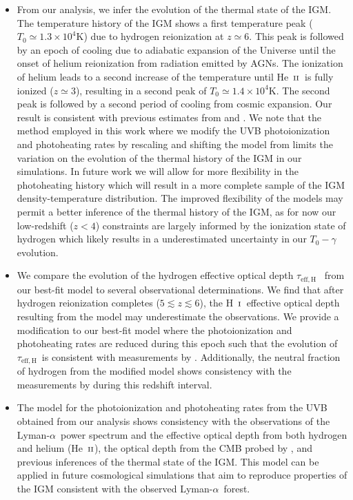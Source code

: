 \documentclass[twocolumn]{aastex62}
\newcommand\Lya{Lyman-$\alpha$}
\def\HI{\hbox{\rm H~$\scriptstyle\rm I$}}
\def\HeII{\hbox{He~$\scriptstyle\rm II$}}
\newcommand\taueffH{$\tau_{\mathrm{eff,H}}$~}
\begin{document}
\begin{itemize}
\item From our analysis, we infer the evolution of the thermal state of the IGM. The temperature
history of the IGM shows a first temperature peak ($T_0 \simeq 1.3 \times 10^4 \mathrm{K}$) due to
hydrogen reionization at $z\simeq 6$. This peak is followed by an epoch of cooling due to adiabatic
expansion of the Universe until the onset of helium reionization 
from radiation emitted by AGNs. The ionization of helium leads to a second increase of the
temperature until \HeII\ is fully ionized ($z\simeq 3$), resulting 
in a second peak of $T_0\simeq 1.4 \times 10^4 \mathrm{K}$. The second peak is
followed by a second period of cooling from cosmic expansion.    
Our result is consistent with previous estimates from \cite{gaikwad2020a} and \cite{gaikwad2020b}.
We note that the method employed in this work where we modify the UVB photoionization and photoheating rates
by rescaling and shifting the model from \cite{puchwein2019a} limits the variation on the evolution of 
the thermal history of the IGM in our simulations. In future work we will allow for more flexibility in the photoheating history
which will result in a more complete sample of the IGM density-temperature distribution. The improved flexibility of the models may permit a better inference of the thermal history of the IGM, as for now our low-redshift ($z < 4$) constraints are largely informed by the 
ionization state of hydrogen which likely results in a underestimated uncertainty in our $T_0 - \gamma$ evolution.              

   
\item We compare the evolution of the hydrogen effective optical depth \taueffH
from our best-fit model to several observational determinations.
We find that after hydrogen reionization completes
($5 \lesssim z \lesssim 6$), the \HI\ effective optical depth resulting from the model may
underestimate the observations. We provide a modification to our best-fit model where the photoionization and photoheating 
rates are reduced during this epoch such that the evolution of \taueffH is consistent with measurements by \cite{Bosman_2018}. 
Additionally, the neutral fraction of hydrogen from the modified model shows consistency with the measurements
by \cite{Fan+2006} during this redshift interval.  
    

\item The model for the photoionization and photoheating rates from the UVB obtained from our analysis shows consistency
with the observations of the \Lya\  
power spectrum and the effective optical depth from both hydrogen and helium (\HeII), the optical depth from the
CMB probed by \cite{Planck_collaboration_2020},
and previous inferences of the thermal state of the IGM.
This model can be applied in future cosmological simulations that aim to reproduce properties of the IGM
consistent with the observed \Lya\ forest.



\end{itemize}
\end{document}
